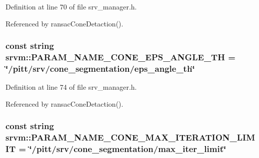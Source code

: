 Definition at line 70 of file srv\-\_\-manager.\-h.



Referenced by ransac\-Cone\-Detaction().

\hypertarget{namespacesrvm_a6023448f3a02902eec73727de0699571}{
\subsubsection[{P\-A\-R\-A\-M\-\_\-\-N\-A\-M\-E\-\_\-\-C\-O\-N\-E\-\_\-\-E\-P\-S\-\_\-\-A\-N\-G\-L\-E\-\_\-\-T\-H}]{\setlength{\rightskip}{0pt plus 5cm}const string srvm\-::\-P\-A\-R\-A\-M\-\_\-\-N\-A\-M\-E\-\_\-\-C\-O\-N\-E\-\_\-\-E\-P\-S\-\_\-\-A\-N\-G\-L\-E\-\_\-\-T\-H = \char`\"{}/pitt/srv/cone\-\_\-segmentation/eps\-\_\-angle\-\_\-th\char`\"{}}}\label{namespacesrvm_a6023448f3a02902eec73727de0699571}


Definition at line 74 of file srv\-\_\-manager.\-h.



Referenced by ransac\-Cone\-Detaction().

\hypertarget{namespacesrvm_a247e146bdc00ad4dc26a1b521b3eb53b}{
\subsubsection[{P\-A\-R\-A\-M\-\_\-\-N\-A\-M\-E\-\_\-\-C\-O\-N\-E\-\_\-\-M\-A\-X\-\_\-\-I\-T\-E\-R\-A\-T\-I\-O\-N\-\_\-\-L\-I\-M\-I\-T}]{\setlength{\rightskip}{0pt plus 5cm}const string srvm\-::\-P\-A\-R\-A\-M\-\_\-\-N\-A\-M\-E\-\_\-\-C\-O\-N\-E\-\_\-\-M\-A\-X\-\_\-\-I\-T\-E\-R\-A\-T\-I\-O\-N\-\_\-\-L\-I\-M\-I\-T = \char`\"{}/pitt/srv/cone\-\_\-segmentation/max\-\_\-iter\-\_\-limit\char`\"{}}}\label{namespacesrvm_a247e146bdc00ad4dc26a1b521b3eb53b}


